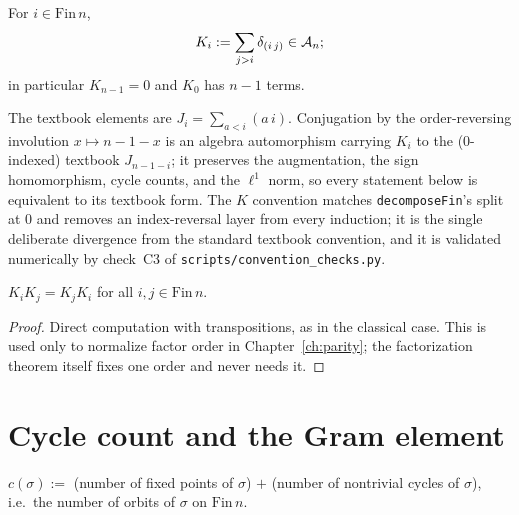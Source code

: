 \begin{definition}\label{def:jm}
\leanok
{}
For $i\in\mathrm{Fin}\,n$,
\[
K_i:=\sum_{j>i}\delta_{(i\,j)}\in\mathcal{A}_{n};
\]
in particular $K_{n-1}=0$ and $K_0$ has $n-1$ terms.
\end{definition}

\begin{remark}\label{rem:dual}
The textbook elements are $J_i=\sum_{a<i}(a\,i)$. Conjugation by the
order-reversing involution $x\mapsto n-1-x$ is an algebra automorphism
carrying $K_i$ to the ($0$-indexed) textbook $J_{n-1-i}$; it preserves the
augmentation, the sign homomorphism, cycle counts, and the $\ell^1$ norm,
so every statement below is equivalent to its textbook form. The $K$
convention matches \texttt{decomposeFin}'s split at $0$ and removes an
index-reversal layer from every induction; it is the single deliberate
divergence from the standard textbook convention, and it is validated
numerically by check~C3 of \texttt{scripts/convention\_checks.py}.
\end{remark}

\begin{lemma}[Commutativity]\label{lem:jm_comm}
\leanok
{}
$K_iK_j=K_jK_i$ for all $i,j\in\mathrm{Fin}\,n$.
\end{lemma}
\begin{proof}
\leanok
{}
Direct computation with transpositions, as in the classical case. This is
used only to normalize factor order in Chapter~\ref{ch:parity}; the
factorization theorem itself fixes one order and never needs it.
\end{proof}

\chapter{Cycle count and the Gram element}\label{ch:cycle}

\begin{definition}\label{def:cycleCount}
\leanok
$c(\sigma):=$ (number of fixed points of $\sigma$) $+$ (number of
nontrivial cycles of $\sigma$), i.e.\ the number of orbits of $\sigma$ on
$\mathrm{Fin}\,n$.
\end{definition}

